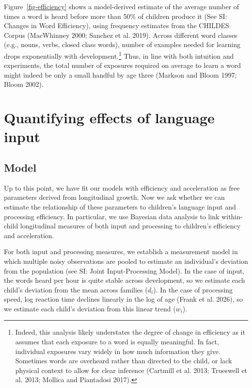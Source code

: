 \documentclass[
  11pt,
]{article}
\begin{document}
Figure~\ref{fig-efficiency} shows a model-derived estimate of the
average number of times a word is heard before more than 50\% of
children produce it (See SI: Changes in Word Efficiency), using
frequency estimates from the CHILDES Corpus (MacWhinney 2000; Sanchez et
al. 2019). Across different word classes (e.g., nouns, verbs, closed
class words), number of examples needed for learning drops exponentially
with development.\footnote{Indeed, this analysis likely understates the
  degree of change in efficiency as it assumes that each exposure to a
  word is equally meaningful. In fact, individual exposures vary widely
  in how much information they give. Sometimes words are overheard
  rather than directed to the child, or lack physical context to allow
  for clear inference (Cartmill et al. 2013; Trueswell et al. 2013;
  Mollica and Piantadosi 2017).} Thus, in line with both intuition and
experiments, the total number of exposures required on average to learn
a word might indeed be only a small handful by age three (Markson and
Bloom 1997; Bloom 2002).

\section{Quantifying effects of language
input}\label{quantifying-effects-of-language-input}

\subsection{Model}\label{model-1}

Up to this point, we have fit our models with efficiency and
acceleration as free parameters derived from longitudinal growth. Now we
ask whether we can estimate the relationship of these parameters to
children's language input and processing efficiency. In particular, we
use Bayesian data analysis to link within-child longitudinal measures of
both input and processing to children's efficiency and acceleration.

For both input and processing measures, we establish a measurement model
in which multiple noisy observations are pooled to estimate an
individual's deviation from the population (see SI: Joint
Input-Processing Model). In the case of input, the words heard per hour
is quite stable across development, so we estimate each child's
deviation from the mean across families (\(d_i\)). In the case of
processing speed, log reaction time declines linearly in the log of age
(Frank et al. 2026), so we estimate each child's deviation from this
linear trend (\(w_i\)).
\end{document}

